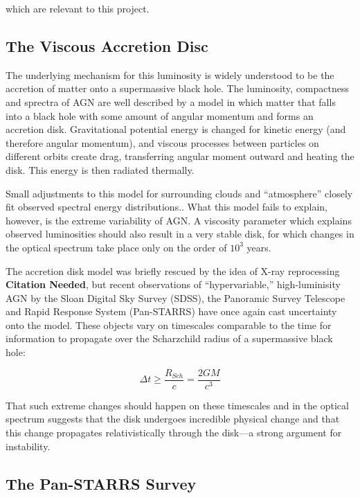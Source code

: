 \documentclass[a4paper,11pt]{article}
\begin{document}
\noindent which are relevant to this project.\cite{mcclure_2019}

\subsection{The Viscous Accretion Disc}

The underlying mechanism for this luminosity is widely understood to be the accretion of matter onto a supermassive black hole.\cite{mcclure_2019} The luminosity, compactness and sprectra of AGN are well described by a model in which matter that falls into a black hole with some amount of angular momentum and forms an accretion disk. Gravitational potential energy is changed for kinetic energy (and therefore angular momentum), and viscous processes between particles on different orbits create drag, transferring angular moment outward and heating the disk. This energy is then radiated thermally.\cite{lawrence_2018}

\noindent Small adjustments to this model for surrounding clouds and ``atmosphere'' closely fit observed spectral energy distributions.\cite{lawrence_2018}. What this model fails to explain, however, is the extreme variability of AGN. A viscosity parameter which explains observed luminosities should also result in a very stable disk, for which changes in the optical spectrum take place only on the order of $10^3$ years.\cite{lawrence_2018}

The accretion disk model was briefly rescued by the idea of X-ray reprocessing \textbf{Citation Needed}, but recent observations of ``hypervariable,'' high-luminisity AGN by the Sloan Digital Sky Survey (SDSS), the Panoramic Survey Telescope and Rapid Response System (Pan-STARRS) have once again cast uncertainty onto the model. These objects vary on timescales comparable to the time for information to propagate over the Scharzchild radius of a supermassive black hole\cite{mcclure_2019}\cite{lawrence_2018}:

\begin{equation}
    \Delta t \geq \frac{R_{Sch}}{c} = \frac{2GM}{c^3}
\end{equation}

\noindent That such extreme changes should happen on these timescales and in the optical spectrum suggests that the disk undergoes incredible physical change and that this change propagates relativistically through the disk---a strong argument for instability.

\subsection{The Pan-STARRS Survey}
\end{document}
